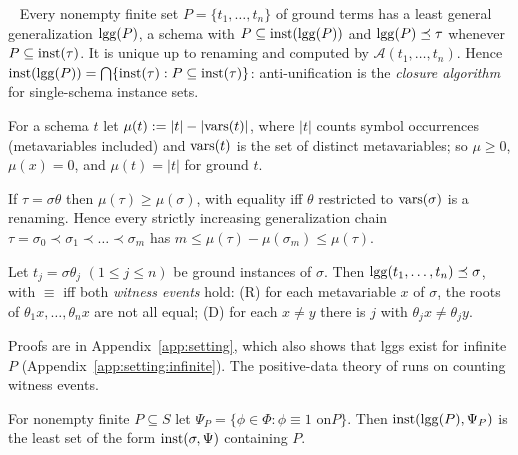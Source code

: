 \begin{theorem}\ \label{thm:setting:lgg}
Every nonempty finite set $P=\{t_1,\dots,t_n\}$ of ground terms has a least
general generalization $\mathrm{lgg}(P)$, a schema with $P\subseteq\mathrm{inst}(\mathrm{lgg}(P))$ and
$\mathrm{lgg}(P)\preceq\tau$ whenever $P\subseteq\mathrm{inst}(\tau)$. It is unique up to
renaming and computed by $\mathcal A(t_1,\dots,t_n)$. Hence
$\mathrm{inst}(\mathrm{lgg}(P))=\bigcap\{\mathrm{inst}(\tau):P\subseteq\mathrm{inst}(\tau)\}$: anti-unification is
the \emph{closure algorithm} for single-schema instance sets.
\end{theorem}

For a schema $t$ let $\mu(t):=|t|-|\mathrm{vars}(t)|$, where $|t|$ counts symbol
occurrences (metavariables included) and $\mathrm{vars}(t)$ is the set of distinct
metavariables; so $\mu\ge0$, $\mu(x)=0$, and $\mu(t)=|t|$ for ground $t$.

\begin{lemma}[Rank]\label{lem:setting:rank}
If $\tau=\sigma\theta$ then $\mu(\tau)\ge\mu(\sigma)$, with equality iff $\theta$
restricted to $\mathrm{vars}(\sigma)$ is a renaming. Hence every strictly increasing
generalization chain $\tau=\sigma_0\prec\sigma_1\prec\dots\prec\sigma_m$ has
$m\le\mu(\tau)-\mu(\sigma_m)\le\mu(\tau)$.
\end{lemma}

\begin{lemma}\label{lem:setting:recover}
Let $t_j=\sigma\theta_j$ $(1\le j\le n)$ be ground instances of $\sigma$. Then
$\mathrm{lgg}(t_1,\dots,t_n)\preceq\sigma$, with $\equiv$ iff both \emph{witness events}
hold: \textup{(R)} for each metavariable $x$ of $\sigma$, the roots of
$\theta_1x,\dots,\theta_nx$ are not all equal; \textup{(D)} for each $x\neq y$
there is $j$ with $\theta_jx\neq\theta_jy$.
\end{lemma}

Proofs are in Appendix~\ref{app:setting}, which also shows that lggs exist for
infinite $P$ (Appendix~\ref{app:setting:infinite}). The positive-data theory of
 runs on counting witness events.

\begin{lemma}\label{lem:setting:guard}
For nonempty finite $P\subseteq S$ let $\Psi_P=\{\phi\in\Phi:\phi\equiv1\text{ on
}P\}$. Then $\mathrm{inst}(\mathrm{lgg}(P),\Psi_P)$ is the least set of the form
$\mathrm{inst}(\sigma,\Psi)$ containing $P$.
\end{lemma}

